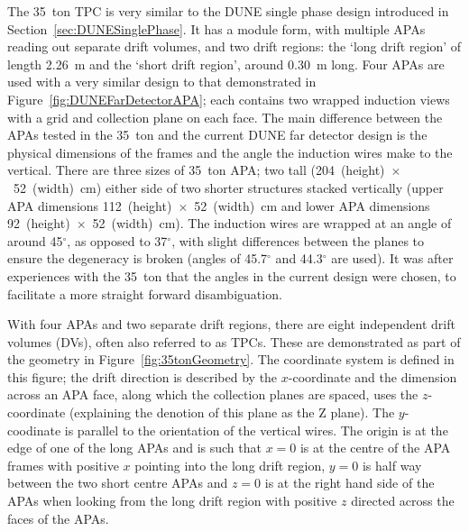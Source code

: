 The 35~ton TPC is very similar to the DUNE single phase design introduced in Section~\ref{sec:DUNESinglePhase}.  It has a module form, with multiple APAs reading out separate drift volumes, and two drift regions: the `long drift region' of length 2.26~m and the `short drift region', around 0.30~m long.  Four APAs are used with a very similar design to that demonstrated in Figure~\ref{fig:DUNEFarDetectorAPA}; each contains two wrapped induction views with a grid and collection plane on each face.  The main difference between the APAs tested in the 35~ton and the current DUNE far detector design is the physical dimensions of the frames and the angle the induction wires make to the vertical.  There are three sizes of 35~ton APA; two tall (204~(height)~$\times$~52~(width)~cm) either side of two shorter structures stacked vertically (upper APA dimensions 112~(height)~$\times$~52~(width)~cm and lower APA dimensions 92~(height)~$\times$~52~(width)~cm).  The induction wires are wrapped at an angle of around 45$^{\circ}$, as opposed to 37$^{\circ}$, with slight differences between the planes to ensure the degeneracy is broken (angles of 45.7$^{\circ}$ and 44.3$^{\circ}$ are used).  It was after experiences with the 35~ton that the angles in the current design were chosen, to facilitate a more straight forward disambiguation.

With four APAs and two separate drift regions, there are eight independent drift volumes (DVs), often also referred to as TPCs.  These are demonstrated as part of the geometry in Figure~\ref{fig:35tonGeometry}.  The coordinate system is defined in this figure; the drift direction is described by the $x$-coordinate and the dimension across an APA face, along which the collection planes are spaced, uses the $z$-coordinate (explaining the denotion of this plane as the Z plane).  The $y$-coodinate is parallel to the orientation of the vertical wires.  The origin is at the edge of one of the long APAs and is such that $x=0$ is at the centre of the APA frames with positive $x$ pointing into the long drift region, $y=0$ is half way between the two short centre APAs and $z=0$ is at the right hand side of the APAs when looking from the long drift region with positive $z$ directed across the faces of the APAs.

